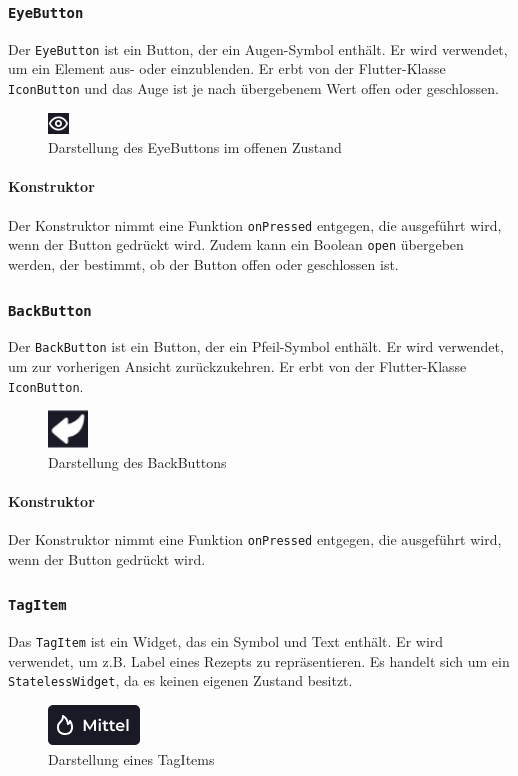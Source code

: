 \documentclass{entwurfsheft}
\begin{document}
\subsubsection{\texttt{EyeButton}}
\label{sec:eyeButton}
Der \texttt{EyeButton} ist ein Button, der ein Augen-Symbol enthält. Er wird verwendet, um ein Element aus- oder einzublenden. Er erbt von der Flutter-Klasse \texttt{IconButton} und das Auge ist je nach übergebenem Wert offen oder geschlossen.
\begin{figure}[htp]
    \centering
    \includegraphics[height = .5cm]{images/presentationLayer/uiElements/eyeButton.png}
    \caption{Darstellung des EyeButtons im offenen Zustand}
\end{figure}
\paragraph*{Konstruktor}
Der Konstruktor nimmt eine Funktion \texttt{onPressed} entgegen, die ausgeführt wird, wenn der Button gedrückt wird. Zudem kann ein Boolean \texttt{open} übergeben werden, der bestimmt, ob der Button offen oder geschlossen ist.
\newpage

\subsubsection{\texttt{BackButton}}
\label{sec:backButton}
Der \texttt{BackButton} ist ein Button, der ein Pfeil-Symbol enthält. Er wird verwendet, um zur vorherigen Ansicht zurückzukehren. Er erbt von der Flutter-Klasse \texttt{IconButton}.
\begin{figure}[htp]
    \centering
    \includegraphics[height = 1cm]{images/presentationLayer/uiElements/backButton.png}
    \caption{Darstellung des BackButtons}
\end{figure}
\paragraph*{Konstruktor}
Der Konstruktor nimmt eine Funktion \texttt{onPressed} entgegen, die ausgeführt wird, wenn der Button gedrückt wird.

\subsubsection{\texttt{TagItem}}
\label{sec:tagItem}
Das \texttt{TagItem} ist ein Widget, das ein Symbol und Text enthält. Er wird verwendet, um z.B. Label eines Rezepts zu repräsentieren. Es handelt sich um ein \texttt{StatelessWidget}, da es keinen eigenen Zustand besitzt.
\begin{figure}[htp]
    \centering
    \includegraphics[height = .7cm]{images/presentationLayer/uiElements/tagItem.png}
    \caption{Darstellung eines TagItems}
\end{figure}
\end{document}
